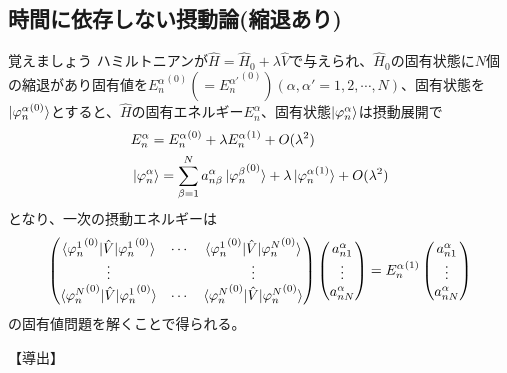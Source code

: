 \documentclass{jsarticle}  %
\numberwithin{equation}{section} %
\numberwithin{figure}{section}
\begin{document}
\subsection{時間に依存しない摂動論(縮退あり)}
    \begin{itembox}[l]{\large{覚えましょう}}
        ハミルトニアンが$\hat{H} = \hat{H}_0 + \lambda \hat{V}$で与えられ、$\hat{H}_0$の固有状態に$N$個の縮退があり固有値を${E_n^\alpha}^{(0)}( = {E_n^{\alpha'}}^{(0)}) (\alpha,\alpha' = 1,2,\cdots,N)$、固有状態を$\ket{{\varphi_n^\alpha}^{(0)}}$とすると、$\hat{H}$の固有エネルギー$E_n^\alpha$、固有状態$\ket{\varphi_n^\alpha}$は摂動展開で
        \begin{align}
            &E_n^\alpha = {E_n^\alpha}^{(0)} + \lambda {E_n^\alpha}^{(1)} + O(\lambda^2) \\
            &\ket{{\varphi_n^\alpha}} = \sum_{\beta=1}^{N} a_{n \beta}^\alpha \ket{{\varphi_n^\beta}^{(0)}} + \lambda \ket{{\varphi_n^\alpha}^{(1)}} + O(\lambda^2)
        \end{align}
        となり、一次の摂動エネルギーは
        \begin{align}
            \left(
            \begin{matrix}
                \braket{{\varphi_n^1}^{(0)}|\hat{V}|{\varphi_n^1}^{(0)}}&\cdots&\braket{{\varphi_n^1}^{(0)}|\hat{V}|{\varphi_n^N}^{(0)}}\\
                \vdots&&\vdots\\
                \braket{{\varphi_n^N}^{(0)}|\hat{V}|{\varphi_n^1}^{(0)}}&\cdots&\braket{{\varphi_n^N}^{(0)}|\hat{V}|{\varphi_n^N}^{(0)}}
            \end{matrix}
            \right)
            \left(
            \begin{matrix}
                a_{n1}^\alpha\\
                \vdots\\
                a_{nN}^\alpha
            \end{matrix}
            \right) = {E_n^\alpha}^{(1)}
            \left(
            \begin{matrix}
                a_{n1}^\alpha\\
                \vdots\\
                a_{nN}^\alpha
            \end{matrix}
            \right)
        \end{align}
        の固有値問題を解くことで得られる。
    \end{itembox}
    {\large{【導出】}}\\
\end{document}
